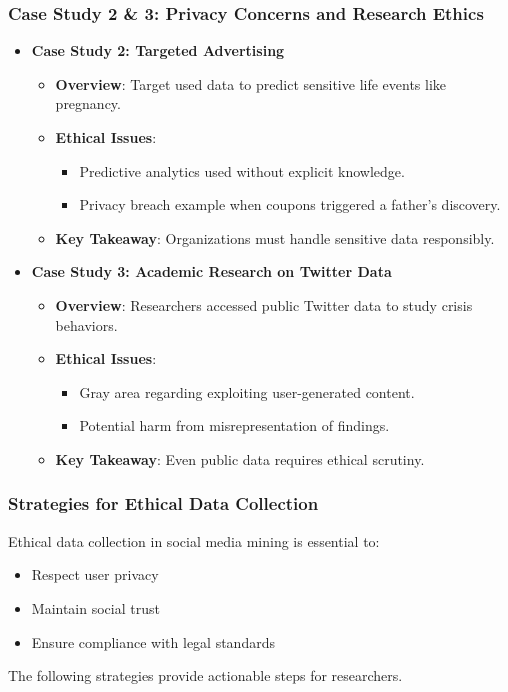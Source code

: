 \documentclass{beamer}
\begin{document}
\begin{frame}[fragile]
    \frametitle{Case Study 2 & 3: Privacy Concerns and Research Ethics}
    \begin{itemize}
        \item \textbf{Case Study 2: Targeted Advertising}
            \begin{itemize}
                \item \textbf{Overview}: Target used data to predict sensitive life events like pregnancy.
                \item \textbf{Ethical Issues}:
                    \begin{itemize}
                        \item Predictive analytics used without explicit knowledge.
                        \item Privacy breach example when coupons triggered a father’s discovery.
                    \end{itemize}
                \item \textbf{Key Takeaway}: Organizations must handle sensitive data responsibly.
            \end{itemize}
        \item \textbf{Case Study 3: Academic Research on Twitter Data}
            \begin{itemize}
                \item \textbf{Overview}: Researchers accessed public Twitter data to study crisis behaviors.
                \item \textbf{Ethical Issues}:
                    \begin{itemize}
                        \item Gray area regarding exploiting user-generated content.
                        \item Potential harm from misrepresentation of findings.
                    \end{itemize}
                \item \textbf{Key Takeaway}: Even public data requires ethical scrutiny.
            \end{itemize}
    \end{itemize}
\end{frame}

\begin{frame}[fragile]
    \frametitle{Strategies for Ethical Data Collection}

    Ethical data collection in social media mining is essential to:
    \begin{itemize}
        \item Respect user privacy
        \item Maintain social trust
        \item Ensure compliance with legal standards
    \end{itemize}
    The following strategies provide actionable steps for researchers.
\end{frame}
\end{document}
